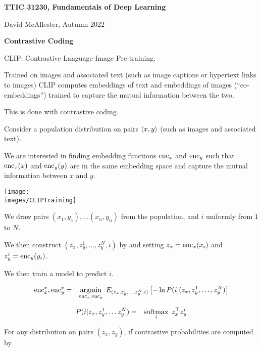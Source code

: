 





{\Huge
  \centerline{\bf TTIC 31230,  Fundamentals of Deep Learning}
  \vfill
  \centerline{David McAllester, Autumn   2022}
  \vfill
  \centerline{\bf Contrastive Coding}
  \vfill
  \vfill



CLIP: Contrastive Language-Image Pre-training.

\vfill
Trained on images and associated text (such as image captions or hypertext links to images) CLIP computes embeddings of text and embeddings of images
(``co-embeddings'') trained to capture the mutual information between the two.

\vfill
This is done with contrastive coding.



Consider a population distribution on pairs ${\mbox{$\langle x,y\rangle$}}$ (such as images and associated text).

\vfill
We are interested in finding embedding functions $\mathrm{enc}_x$ and $\mathrm{enc}_y$ such that $\mathrm{enc}_x(x)$ and $\mathrm{enc}_y(y)$ are in the same embedding space
and capture the mutual information between $x$ and $y$.


\centerline{\texttt{[image: \\images/CLIPTraining]}}



\vfill
We draw pairs $(x_1,y_1), \ldots (x_n,y_n)$ from the population, and $i$ uniformly from $1$ to $N$.

\vfill
We then construct $(z_x,z_{y}^1,\ldots,z_y^N,i)$
by and setting $z_x = \mathrm{enc}_x(x_i)$ and $z_y^i = \mathrm{enc}_y(y_i)$.

\vfill
We then train a model to predict $i$.
\vfill
{\huge
\begin{eqnarray*}
\mathrm{enc}_x^*,\mathrm{enc}_y^* & = & \operatorname*{argmin}_{\mathrm{enc}_x,\mathrm{enc}_y} \;E_{(z_x,z_y^1,\ldots,z_y^N,i)}\left[-\ln P(i|(z_x,z_y^1,\ldots,z_y^N)\right]
\end{eqnarray*}

\begin{eqnarray*}
P(i|z_x,z_y^1,\ldots z_y^N) & = & \operatorname*{softmax}_i\; z_x^\top z_y^i
\end{eqnarray*}
}


For any distribution on pairs $(z_x,z_y)$, if contrastive probabilities are computed by

}
